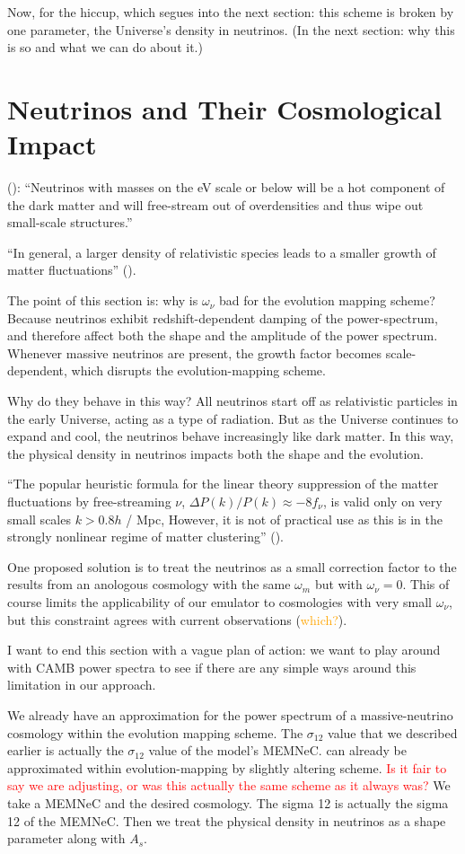 Now, for the hiccup, which segues into the next section: this scheme is broken by one parameter, the Universe's
density in neutrinos. (In the next section: why this is so and what we can do
about it.)


\section{Neutrinos and Their Cosmological Impact}

(): ``Neutrinos with masses on the eV scale or below will be a
hot component of the dark matter and will free-stream out of overdensities and
thus wipe out small-scale structures.''

``In general, a larger density of relativistic species leads to a smaller
growth of matter fluctuations'' ().

The point of this section is: why is $\omega_\nu$ bad for the
evolution mapping scheme? Because neutrinos exhibit redshift-dependent
damping of the power-spectrum, and therefore affect both the shape and the
amplitude of the power spectrum. Whenever massive neutrinos are present,
the growth factor becomes scale-dependent, which disrupts the
evolution-mapping scheme.

Why do they behave in this way? All neutrinos start off as
relativistic particles in the early Universe, acting as a type of radiation.
But as the Universe continues to expand and cool, the neutrinos behave
increasingly like dark matter.
In this way, the physical density in neutrinos impacts both the shape and the
evolution.

``The popular heuristic formula for the linear theory suppression of the matter
fluctuations by free-streaming $\nu$, $\Delta P(k) / P(k) \approx -8 f_\nu$, is
valid only on very small scales $k > 0.8 h$ / Mpc, However, it is not of
practical use as this is in the strongly nonlinear regime of matter
clustering'' ().

One proposed solution is to treat the neutrinos as a small correction factor
to the results from an anologous cosmology with the same $\omega_m$ but with
$\omega_\nu = 0$. This of course limits the applicability of our emulator to
cosmologies with very small $\omega_\nu$, but this constraint agrees with
current observations (\textcolor{orange}{which?}).

I want to end this section with a vague plan of action: we want to play around with CAMB power spectra to see if there are any simple ways around this limitation in our approach.



We already have an approximation for the power spectrum of a massive-neutrino cosmology within the evolution mapping scheme. The $\sigma_{12}$ value that we described earlier is actually the $\sigma_{12}$ value of the model's MEMNeC. can already be approximated within evolution-mapping by slightly altering scheme. \textcolor{red}{Is it fair to say we are adjusting, or was this actually the same scheme as it always was?} We take a MEMNeC and the desired cosmology. The sigma 12 is actually the sigma 12 of the MEMNeC. Then we treat the physical density in neutrinos as a shape parameter along with $A_s$.
